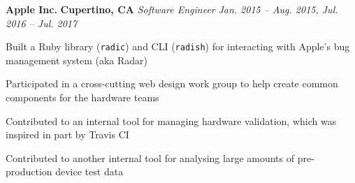 \item
\headerrow
{\textbf{Apple Inc.}}
{\textbf{Cupertino, CA}}
\headerrow
{\emph{Software Engineer}}
{\emph{Jan. 2015 -- Aug. 2015, Jul. 2016 -- Jul. 2017}}
\begin{itemize*}
    \item Built a Ruby library (\texttt{radic}) and CLI (\texttt{radish}) for
    interacting with Apple's bug management system (aka Radar)
    \item Participated in a cross-cutting web design work group to help create
    common components for the hardware teams
    \item Contributed to an internal tool for managing hardware validation,
    which was inspired in part by Travis CI
    \item Contributed to another internal tool for analysing large amounts of
    pre-production device test data
\end{itemize*}
